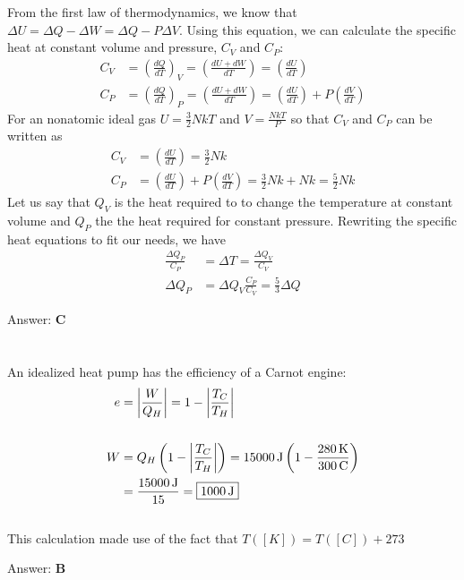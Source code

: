 \documentclass[12pt]{article}
\newcommand{\Answer}[1]{Answer: \textbf{#1}}
\newcommand{\Problem}[3]{
    \setcounter{section}{#1}
    \addtocounter{section}{-1}
    \section{}
    #3\par\par
    \Answer{#2}
}
\begin{document}
\Problem{34}{C}{%
From the first law of thermodynamics, we know that $\Delta U = \Delta Q - \Delta W = \Delta Q - P\Delta V$. Using this equation, we can calculate the specific heat at constant volume and pressure, $C_{V}$ and $C_{P}$:
\begin{align}
C_{V} &= {\left(\frac{d Q}{d T}\right)}_{V} = \left(\frac{d U + dW}{d T}\right) = \left(\frac{d U}{d T}\right)\\
C_{P} &= {\left(\frac{d Q}{d T}\right)}_{P} = \left(\frac{d U + dW}{d T}\right) = \left(\frac{d U}{d T}\right) + P\left(\frac{d V}{d T}\right)
\end{align}
For an nonatomic ideal gas $U = \frac{3}{2}NkT$ and $V= \frac{NkT}{P}$ so that $C_{V}$ and $C_{P}$ can be written as
\begin{align}
C_{V} &= \left(\frac{d U}{d T}\right) = \frac{3}{2}Nk\nonumber\\
C_{P} &= \left(\frac{d U}{d T}\right) + P\left(\frac{d V}{d T}\right) =  \frac{3}{2}Nk + Nk = \frac{5}{2}Nk\nonumber
\end{align}
Let us say that $Q_{V}$ is the heat required to to change the temperature at constant volume and $Q_{P}$ the the heat required for constant pressure. Rewriting the specific heat equations to fit our needs, we have
\begin{align}
\frac{\Delta Q_{P}}{C_{P}} &= \Delta T = \frac{\Delta Q_{V}}{C_{V}}\nonumber\\
\Delta Q_{P} &= \Delta Q_{V}\frac{C_{P}}{C_{V}} = \boxed{\frac{5}{3} \Delta Q}
\end{align}
}

\Problem{35}{B}{%
An idealized heat pump has the efficiency of a Carnot engine:
\begin{align}
e &= \left| \frac{W}{Q_{H}}\right| = 1- \left|\frac{T_{C}}{T_{H}}\right|\\
\nonumber \\
W &= Q_{H} \left(1- \left|\frac{T_{C}}{T_{H}}\right|\right)= 15000\,\text{J} \left(1- \frac{280\,\text{K}}{300\,\text{C}}\right)\nonumber \\
 &= \frac{15000\,\text{J}}{15} = \boxed{1000\,\text{J}}\nonumber
\end{align}
\\
This calculation made use of the fact that $T([K]) = T([C]) + 273$
}
\end{document}
